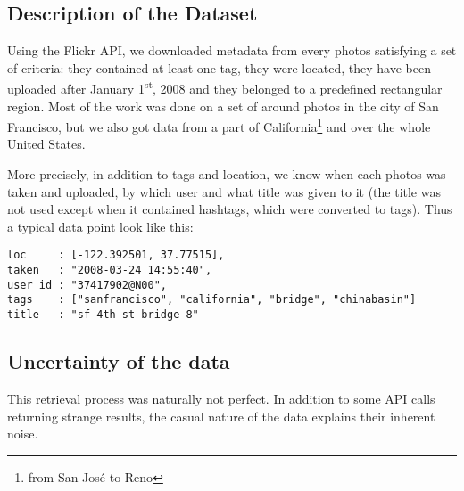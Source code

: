 \subsection{Description of the Dataset}

Using the Flickr API, we downloaded metadata from every photos satisfying a
set of criteria: they contained at least one tag, they were located, they have
been uploaded after January 1\textsuperscript{st}, 2008 and they belonged to a
predefined rectangular region. Most of the work was done on a set of around
 photos in the city of San Francisco, but we also got data
from a part of California\footnote{from San José to Reno} and over the whole
United States.

More precisely, in addition to tags and location, we know when each photos was
taken and uploaded, by which user and what title was given to it (the title
was not used except when it contained hashtags, which were converted to tags).
Thus a typical data point look like this:

\vspace{\baselineskip}
{\centering\begin{minipage}{0.7\linewidth}
  \begin{Verbatim}[frame=none, gobble=0]
loc     : [-122.392501, 37.77515],
taken   : "2008-03-24 14:55:40",
user_id : "37417902@N00",
tags    : ["sanfrancisco", "california", "bridge", "chinabasin"]
title   : "sf 4th st bridge 8"
  \end{Verbatim}
\end{minipage}\par}

\subsection{Uncertainty of the data}
\label{p:data}

This retrieval process was naturally not perfect. In addition to some API
calls returning strange results, the casual nature of the data explains their
inherent noise.

